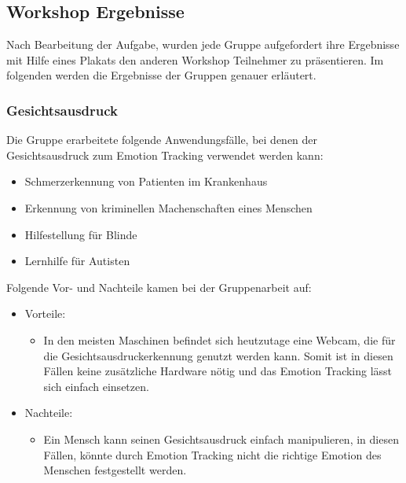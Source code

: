 \subsection{Workshop Ergebnisse}\label{Umsetzung_Anwendungsfaelle_Ergebnisse}
Nach Bearbeitung der Aufgabe, wurden jede Gruppe aufgefordert ihre Ergebnisse mit Hilfe eines Plakats den anderen Workshop Teilnehmer zu präsentieren. Im folgenden werden die Ergebnisse der Gruppen genauer erläutert.

\subsubsection{Gesichtsausdruck}
Die Gruppe erarbeitete folgende Anwendungsfälle, bei denen der Gesichtsausdruck zum Emotion Tracking verwendet werden kann:
\begin{itemize}
	\item Schmerzerkennung von Patienten im Krankenhaus
	\item Erkennung von kriminellen Machenschaften eines Menschen
	\item Hilfestellung für Blinde
	\item Lernhilfe für Autisten
\end{itemize}
Folgende Vor- und Nachteile kamen bei der Gruppenarbeit auf:
\begin{itemize}
	\item Vorteile:
	\begin{itemize}
		\item In den meisten Maschinen befindet sich heutzutage eine Webcam, die für die Gesichtsausdruckerkennung genutzt werden kann. Somit ist in diesen Fällen keine zusätzliche Hardware nötig und das Emotion Tracking lässt sich einfach einsetzen.		 
	\end{itemize}
	\item Nachteile:
	\begin{itemize}
		\item Ein Mensch kann seinen Gesichtsausdruck einfach manipulieren, in diesen Fällen, könnte durch Emotion Tracking nicht die richtige Emotion des Menschen festgestellt werden.
	\end{itemize}
\end{itemize}

